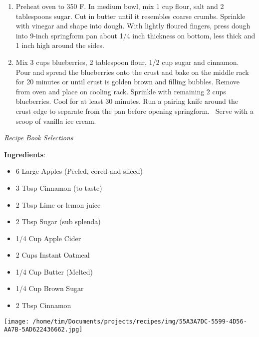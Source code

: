 \documentclass[11pt, twoside, openany]{book}
\begin{document}
\vspace{-3mm}\begin{enumerate}\setlength\itemsep{-1mm}
\item Preheat oven to 350 F. In medium bowl, mix 1 cup flour, salt and 2 tablespoons sugar. Cut in butter until it resembles coarse crumbs. Sprinkle with vinegar and shape into dough. With lightly floured fingers, press dough into 9-inch springform pan about 1/4 inch thickness on bottom, less thick and 1 inch high around the sides.
\item Mix 3 cups blueberries, 2 tablespoon flour, 1/2 cup sugar and cinnamon. Pour and spread the blueberries onto the crust and bake on the middle rack for 20 minutes or until crust is golden brown and filling bubbles. Remove from oven and place on cooling rack. Sprinkle with remaining 2 cups blueberries. Cool for at least 30 minutes. Run a pairing knife around the crust edge to separate from the pan before opening springform.  Serve with a scoop of vanilla ice cream.
\end{enumerate}
 \label{apple-cobbler}\hfill\textit{Recipe Book Selections}\\
\begin{minipage}[t]{0.8\linewidth}
\textbf{Ingredients}:\vspace{-3mm}
\begin{multicols}{2}
\begin{itemize}\setlength\itemsep{-1mm}
\item 6 Large Apples (Peeled, cored and sliced)
\item 3 Tbsp Cinnamon (to taste)
\item 2 Tbsp Lime or lemon juice
\item 2 Tbsp Sugar (sub splenda)
\item 1/4 Cup Apple Cider
\item 2 Cups Instant Oatmeal
\item 1/4 Cup Butter (Melted)
\item 1/4 Cup Brown Sugar
\item 2 Tbsp Cinnamon
\end{itemize}
\end{multicols}
\end{minipage}
\begin{minipage}[t]{0.2\linewidth}
\centering \strut\vspace*{-\baselineskip}\newline
\texttt{[image: /home/tim/Documents/projects/recipes/img/55A3A7DC-5599-4D56-AA7B-5AD622436662.jpg]}\\
\end{minipage}\vspace{3mm}
\end{document}
